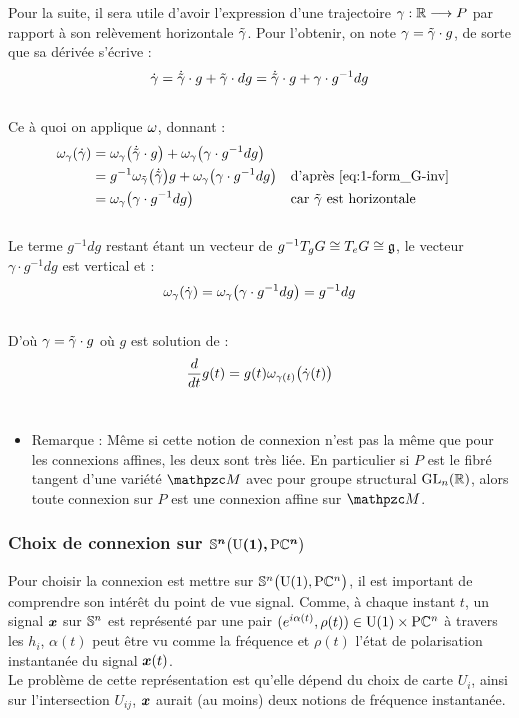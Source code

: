 Pour la suite, il sera utile d'avoir l'expression d'une trajectoire $\gamma:\R\lr P$ par rapport à son relèvement horizontale $\Tilde{\gamma}$. Pour l'obtenir, on note  $\gamma = \Tilde{\gamma}\cdot g$, de sorte que sa dérivée s'écrive :
\[\dot{\gamma} = \dot{\Tilde{\gamma}}\cdot g + \Tilde{\gamma}\cdot dg = \dot{\Tilde{\gamma}}\cdot g + \gamma \cdot g^{-1}dg\]
\\
Ce à quoi on applique $\conn$, donnant :
\begin{align*}
	\conn_\gamma(\dot{\gamma}) &= \conn_\gamma\big( \dot{\Tilde{\gamma}}\cdot g \big) + \conn_\gamma \big( \gamma \cdot g^{-1}dg \big) \\
	&= g^{-1}\conn_{\Tilde{\gamma}}\big(\dot{\Tilde{\gamma}} \big) g + \conn_\gamma \big( \gamma \cdot g^{-1}dg \big)   &  &\text{d'après \eqref{eq:1-form_G-inv}} \\
	&= \conn_\gamma \big( \gamma \cdot g^{-1}dg \big)  &  &\text{car $\Tilde{\gamma}$ est horizontale}
\end{align*}
\\
Le terme $g^{-1}dg$ restant étant un vecteur de $g^{-1}\tg[g]{G}\cong \tg[e]{G}\cong \mathfrak{g}$, le vecteur $\gamma \cdot g^{-1}dg$ est vertical et :
\[\conn_\gamma(\dot{\gamma}) = \conn_\gamma \big( \gamma \cdot g^{-1}dg \big) = g^{-1}dg\]
\\
D'où $\gamma = \Tilde{\gamma}\cdot g$ où $g$ est solution de :
\begin{equation} \label{eq:deviation2hozi}
	\frac{d}{dt}g(t)  = g(t) \conn_{\gamma(t)}\big( \dot{\gamma}(t) \big)
\end{equation}
\\
\begin{itemize}
	
	\item Remarque : Même si cette notion de connexion n'est pas la même que pour les connexions affines, les deux sont très liée. En particulier si $P$ est le fibré tangent d'une variété $\manu$ avec pour groupe structural $\GL_n(\R)$, alors toute connexion sur $P$ est une connexion affine sur $\manu$.
	
\end{itemize}
\skipl



\subsubsection{Choix de connexion sur $\bf{\VFP}$}\label{subsec:conn2SUPC}

Pour choisir la connexion est mettre sur $\VFP$, il est important de comprendre son intérêt du point de vue signal.
Comme, à chaque instant $t$, un signal $\x$ sur $\S{n}$ est représenté par une pair $(e^{i\alpha(t)}, \rho(t))\in\U{1}\times\PC{n}$ à travers les $h_i$, $\alpha(t)$ peut être vu comme la fréquence et $\rho(t)$ l'état de polarisation instantanée du signal $\x(t)$.
\\
Le problème de cette représentation est qu'elle dépend du choix de carte $U_i$, ainsi sur l'intersection $U_{ij}$, $\x$ aurait (au moins) deux notions de fréquence instantanée.
\\

